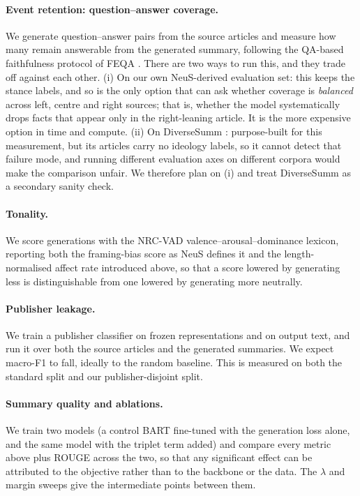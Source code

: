 \documentclass[11pt]{article}
\begin{document}
\paragraph{Event retention: question--answer coverage.} We generate
question--answer pairs from the source articles and measure how many remain
answerable from the generated summary, following the QA-based faithfulness
protocol of FEQA \citep{durmus2020feqa}. There are two ways to run this, and they
trade off against each other. (i) On our own NeuS-derived evaluation set: this
keeps the stance labels, and so is the only option that can ask whether coverage
is \emph{balanced} across left, centre and right sources; that is, whether the
model systematically drops facts that appear only in the right-leaning article.
It is the more expensive option in time and compute. (ii) On DiverseSumm
\citep{huang2024diversesumm}: purpose-built for this measurement, but its
articles carry no ideology labels, so it cannot detect that failure mode, and
running different evaluation axes on different corpora would make the comparison
unfair. We therefore plan on (i) and treat DiverseSumm as a secondary sanity
check.

\paragraph{Tonality.} We score generations with the NRC-VAD
\citep{mohammad2018vad} valence--arousal--dominance lexicon, reporting both the
framing-bias score as NeuS defines it and the length-normalised affect rate
introduced above, so that a score lowered by generating less is distinguishable
from one lowered by generating more neutrally.

\paragraph{Publisher leakage.} We train a publisher classifier on frozen
representations and on output text, and run it over both the source articles and
the generated summaries. We expect macro-F1 to fall, ideally to the random
baseline. This is measured on both the standard split and our publisher-disjoint
split.

\paragraph{Summary quality and ablations.} We train two models (a control BART
fine-tuned with the generation loss alone, and the same model with the triplet
term added) and compare every metric above plus ROUGE across the two, so that
any significant effect can be attributed to the objective rather than to the
backbone or the data. The $\lambda$ and margin sweeps give the intermediate
points between them.
\end{document}
